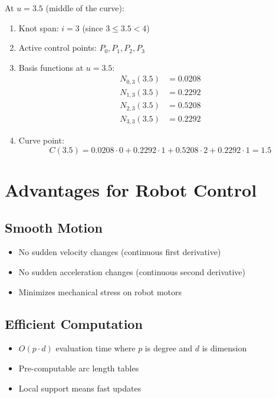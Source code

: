 \documentclass[12pt,a4paper]{article}
\begin{document}
At $u = 3.5$ (middle of the curve):
\begin{enumerate}
    \item Knot span: $i = 3$ (since $3 \leq 3.5 < 4$)
    \item Active control points: $P_0, P_1, P_2, P_3$
    \item Basis functions at $u = 3.5$:
    \begin{align*}
        N_{0,3}(3.5) &= 0.0208 \\
        N_{1,3}(3.5) &= 0.2292 \\
        N_{2,3}(3.5) &= 0.5208 \\
        N_{3,3}(3.5) &= 0.2292
    \end{align*}
    \item Curve point: 
    \begin{equation*}
        C(3.5) = 0.0208 \cdot 0 + 0.2292 \cdot 1 + 0.5208 \cdot 2 + 0.2292 \cdot 1 = 1.5
    \end{equation*}
\end{enumerate}

\section{Advantages for Robot Control}

\subsection{Smooth Motion}
\begin{itemize}
    \item No sudden velocity changes (continuous first derivative)
    \item No sudden acceleration changes (continuous second derivative)
    \item Minimizes mechanical stress on robot motors
\end{itemize}

\subsection{Efficient Computation}
\begin{itemize}
    \item $O(p \cdot d)$ evaluation time where $p$ is degree and $d$ is dimension
    \item Pre-computable arc length tables
    \item Local support means fast updates
\end{itemize}
\end{document}

